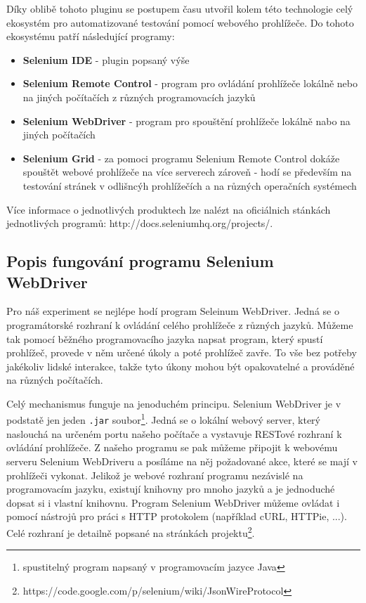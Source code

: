 \documentclass[thesis=M,czech]{FITthesis}[2013/05/10]
\begin{document}
Díky oblibě tohoto pluginu se postupem času utvořil kolem této technologie celý ekosystém pro automatizované testování pomocí webového prohlížeče. Do tohoto ekosystému patří následující programy:

\begin{itemize}
  \item \textbf{Selenium IDE} - plugin popsaný výše
  \item \textbf{Selenium Remote Control} - program pro ovládání prohlížeče lokálně nebo na jiných počítačích z různých programovacích jazyků
  \item \textbf{Selenium WebDriver} - program pro spouštění prohlížeče lokálně nabo na jiných počítačích
  \item \textbf{Selenium Grid} - za pomoci programu Selenium Remote Control dokáže spouštět webové prohlížeče na více serverech zároveň - hodí se především na testování stránek v odlišncýh prohlížečích a na různých operačních systémech
\end{itemize}

Více informace o jednotlivých produktech lze nalézt na oficiálnich stánkách jednotlivých programů: http://docs.seleniumhq.org/projects/. 

\subsection{Popis fungování programu Selenium WebDriver}

Pro náš experiment se nejlépe hodí program Seleinum WebDriver. Jedná se o programátorské rozhraní k ovládání celého prohlížeče z různých jazyků. Můžeme tak pomocí běžného programovacího jazyka napsat program, který spustí prohlížeč, provede v něm určené úkoly a poté prohlížeč zavře. To vše bez potřeby jakékoliv lidské interakce, takže tyto úkony mohou být opakovatelné a prováděné na různých počítačích.

Celý mechanismus funguje na jenoduchém principu. Selenium WebDriver je v podstatě jen jeden \verb|.jar| soubor\footnote{spustitelný program napsaný v programovacím jazyce Java}. Jedná se o lokální webový server, který naslouchá na určeném portu našeho počítače a vystavuje RESTové rozhraní k ovládání prohlížeče. Z našeho programu se pak můžeme připojit k webovému serveru Selenium WebDriveru a posíláme na něj požadované akce, které se mají v prohlížeči vykonat. Jelikož je webové rozhraní programu nezávislé na programovacím jazyku, existují knihovny pro mnoho jazyků a je jednoduché dopsat si i vlastní knihovnu. Program Selenium WebDriver můžeme ovládat i pomocí nástrojů pro práci s HTTP protokolem (například cURL, HTTPie, ...). Celé rozhraní je detailně popsané na stránkách projektu\footnote{https://code.google.com/p/selenium/wiki/JsonWireProtocol}.
\end{document}

